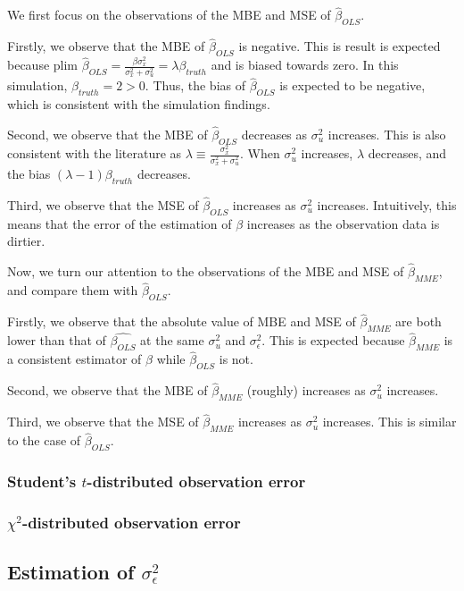 \documentclass{article}
\begin{document}
We first focus on the observations of the MBE and MSE of $\hat{\beta}_{OLS}$.

Firstly, we observe that the MBE of $\hat{\beta}_{OLS}$ is negative.
This is result is expected because $\textrm{plim } \hat{\beta}_{OLS} = \frac{\beta \sigma^2_x}{\sigma^2_x + \sigma^2_u} = \lambda \beta_{truth}$ and is biased towards zero.
In this simulation, $\beta_{truth} = 2 > 0$.
Thus, the bias of $\hat{\beta}_{OLS}$ is expected to be negative, which is consistent with the simulation findings.

Second, we observe that the MBE of $\hat{\beta}_{OLS}$ decreases as $\sigma^2_u$ increases.
This is also consistent with the literature as $\lambda \equiv \frac{\sigma_x^2}{\sigma_x^2 + \sigma_u^2}$.
When $\sigma^2_u$ increases, $\lambda$ decreases, and the bias $(\lambda-1)\beta_{truth}$ decreases.

Third, we observe that the MSE of $\hat{\beta}_{OLS}$ increases as $\sigma^2_u$ increases. Intuitively, this means that the error of the estimation of $\beta$ increases as the observation data is dirtier. 

Now, we turn our attention to the observations of the MBE and MSE of $\hat{\beta}_{MME}$, and compare them with $\hat{\beta}_{OLS}$.

Firstly, we observe that the absolute value of MBE and MSE of $\hat{\beta}_{MME}$ are both lower than that of $\hat{\beta_{OLS}}$ at the same $\sigma^2_u$ and $\sigma^2_\epsilon$.
This is expected because $\hat{\beta}_{MME}$ is a consistent estimator of $\beta$ while $\hat{\beta}_{OLS}$ is not.

Second, we observe that the MBE of $\hat{\beta}_{MME}$ (roughly) increases as $\sigma^2_u$ increases.

Third, we observe that the MSE of $\hat{\beta}_{MME}$ increases as $\sigma^2_u$ increases. This is similar to the case of $\hat{\beta}_{OLS}$.

\subsubsection{Student's $t$-distributed observation error}

\subsubsection{$\chi^2$-distributed observation error}

\subsection{Estimation of $\sigma^2_\epsilon$}
\end{document}
